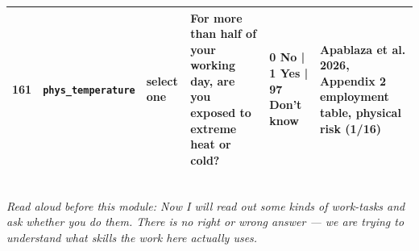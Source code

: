 \documentclass[9pt,a4paper,landscape]{article}
\begin{document}
\begin{longtable}{@{}p{0.5cm}p{3.3cm}p{1.7cm}p{7.3cm}p{5.6cm}p{5.4cm}@{}}
\footnotesize 161 & \footnotesize\texttt{phys\_temperature} & \scriptsize select one & \footnotesize For more than half of your working day, are you exposed to extreme heat or cold?\par\vspace{1pt}{\footnotesize\color{hdr}{\hifont काम के दिन के आधे से ज़्यादा समय, क्या आप बहुत गर्मी या बहुत ठंड में रहते हैं?}} & \scriptsize 0 No | 1 Yes | 97 Don't know & \scriptsize Apablaza et al. 2026, Appendix 2 employment table, physical risk (1/16)\\
\bottomrule\end{longtable}\vspace{6pt}
\\[3pt]
{\small\itshape Read aloud before this module: Now I will read out some kinds of work-tasks and ask whether you do them. There is no right or wrong answer — we are trying to understand what skills the work here actually uses.}\\[5pt]
\end{document}
